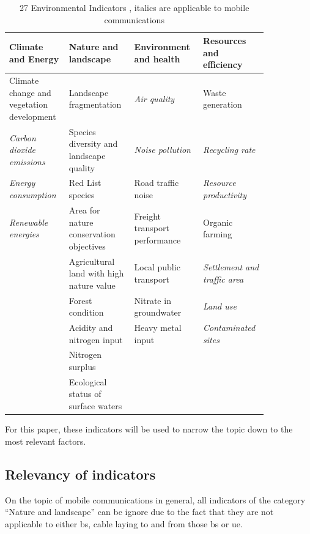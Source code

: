 \documentclass[11pt,a4paper]{article}
\begin{document}
\begin{table}[t]
  \centering
  \begin{tabular}{p{0.21\linewidth}|p{0.21\linewidth}|p{0.21\linewidth}|p{0.21\linewidth}}
    \textbf{Climate and Energy} & \textbf{Nature and landscape} & \textbf{Environment and health} & \textbf{Resources and efficiency}\\
    \hline
    Climate change and vegetation development & Landscape fragmentation & \textit{Air quality} & Waste generation\\
    \hline
    \textit{Carbon dioxide emissions} & Species diversity and landscape quality & \textit{Noise pollution} & \textit{Recycling rate}\\
    \hline
    \textit{Energy consumption} & Red List species & Road traffic noise & \textit{Resource productivity}\\
    \hline
    \textit{Renewable energies} & Area for nature conservation objectives & Freight transport performance & Organic farming\\
    \hline
    & Agricultural land with high nature value & Local public transport & \textit{Settlement and traffic area}\\
    \hline
    & Forest condition & Nitrate in groundwater & \textit{Land use}\\
    \hline
    & Acidity and nitrogen input & Heavy metal input & \textit{Contaminated sites}\\
    \hline
    & Nitrogen surplus &\\
    \hline
    & Ecological status of surface waters &\\
  \end{tabular}
  \caption{27 Environmental Indicators \citep{Umweltindikatoren}, italics are applicable to mobile communications}
  \label{tab:indicators}
\end{table}

For this paper, these indicators will be used to narrow the topic down to the most relevant factors.

\subsection{Relevancy of indicators}\label{subsec:relevancy}

On the topic of mobile communications in general, all indicators of the category \enquote{Nature and landscape} can be ignore due to the fact that they are not applicable to either \acrshort{bs}, cable laying to and from those \acrshort{bs} or \acrshort{ue}.
\end{document}
